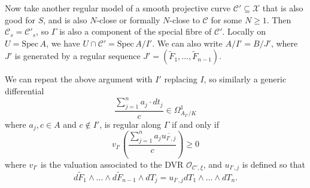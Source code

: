 \documentclass{article}
\theoremstyle{definition}
\theoremstyle{plain}
\theoremstyle{remark}
\newcommand{\spec}{\mathrm{Spec}\,}
\begin{document}
	Now take another regular model of a smooth projective curve $\mathcal{C}'\subseteq \mathcal{X}$ that is also good for $S$, and is also $N$-close or formally $N$-close to $\mathcal{C}$ for some $N\ge 1$. Then $\mathcal{C}_s = \mathcal{C}'_s$, so $\Gamma$ is also a component of the special fibre of $\mathcal{C}'$. Locally on $U = \spec A$, we have $U\cap \mathcal{C}' = \spec A/I'$. We can also write $A/I' = B/J'$, where $J'$ is generated by a regular sequence $J' = (\widetilde{F}_1, \ldots, \widetilde{F}_{n-1})$.
	
	We can repeat the above argument with $I'$ replacing $I$, so similarly a generic differential
	\[\frac{\sum_{j=1}^n a_j \cdot dt_j}{c}\in \Omega^1_{A_{I'}/K}\]
	where $a_j, c\in A$ and $c\not\in I'$, is regular along $\Gamma$ if and only if
	\[v_{I'}\left(\frac{\sum_{j=1}^n a_j\overline{u_{I', j}}}{c}\right)\ge 0\]
	where $v_{I'}$ is the valuation associated to the DVR $\mathcal{O}_{\mathcal{C'}, \xi}$, and $u_{I',j}$ is defined so that
	\[d\widetilde{F}_1\wedge \ldots \wedge d\widetilde{F}_{n-1}\wedge dT_j = u_{I',j}dT_1\wedge \ldots \wedge dT_n.\]
	
\end{document}
